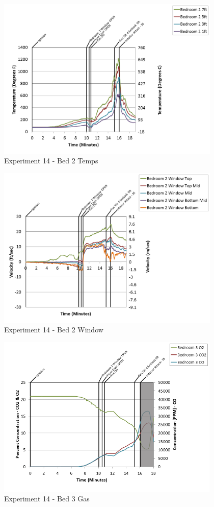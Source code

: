 \documentclass{article}
\begin{document}
\begin{appendices}
\clearpage

\begin{figure}[h!]
	\centering
	\includegraphics[height=3.05in]{0_Images/Results_Charts/Exp_14_Charts/Bed2Temps.png}
	\caption{Experiment 14 - Bed 2 Temps}
\end{figure}


\begin{figure}[h!]
	\centering
	\includegraphics[height=3.05in]{0_Images/Results_Charts/Exp_14_Charts/Bed2Window.png}
	\caption{Experiment 14 - Bed 2 Window}
\end{figure}

\clearpage

\begin{figure}[h!]
	\centering
	\includegraphics[height=3.05in]{0_Images/Results_Charts/Exp_14_Charts/Bed3Gas.png}
	\caption{Experiment 14 - Bed 3 Gas}
\end{figure}



\end{appendices}
\end{document}
